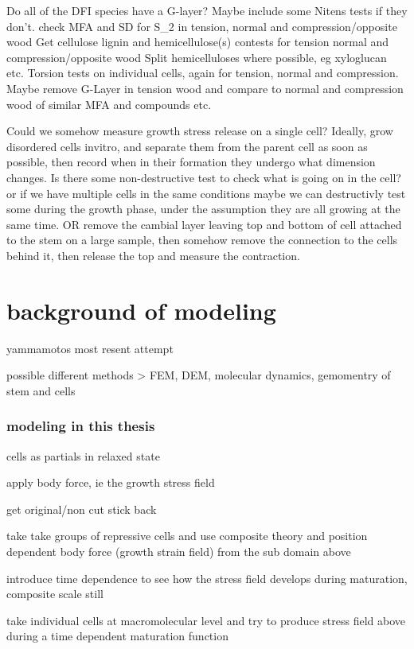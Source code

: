 \documentclass{article}
\begin{document}
Do all of the DFI species have a G-layer?
Maybe include some Nitens tests if they don't.
check MFA and SD for S\_2 in tension, normal and compression/opposite wood
Get cellulose lignin and hemicellulose(s) contests for tension normal and
compression/opposite wood Split hemicelluloses where possible, eg xyloglucan
etc.
Torsion tests on individual cells, again for tension, normal and compression. Maybe remove G-Layer
in tension wood and compare to normal and compression wood of similar MFA and compounds etc.

Could we somehow measure growth stress release on a single cell?
Ideally, grow disordered cells invitro, and separate them from the parent cell
as soon as possible, then record when in their formation they undergo what
dimension changes. Is there some non-destructive test to check what is going on in the cell? or if we have multiple cells in the same conditions maybe we can destructivly test some during the growth phase, under the assumption they are all growing at the same time.
OR
remove the cambial layer leaving top and bottom of cell attached to the stem on a large sample,
then somehow remove the connection to the cells behind it, then release the top and measure the contraction.


\section{background of modeling}

yammamotos most resent attempt

possible different methods > FEM, DEM, molecular dynamics, gemomentry of stem
and cells

\subsubsection{modeling in this thesis}
cells as partials in relaxed state

apply body force, ie the growth stress field

get original/non cut stick back

take take groups of repressive cells and use composite theory and position dependent body force
(growth strain field) from the sub domain above

introduce time dependence to see how the stress field develops during
maturation, composite scale still

take individual cells at macromolecular level and try to produce stress field
above during a time dependent maturation function
\end{document}
